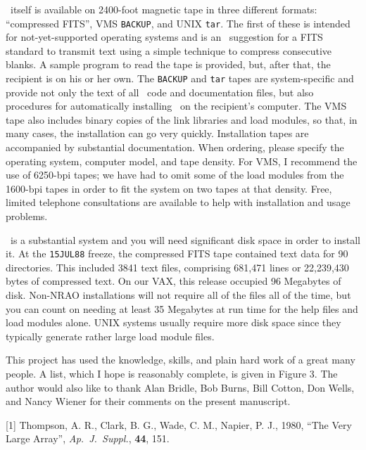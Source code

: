      \Aips\ itself is available on 2400-foot magnetic tape in three
different formats: ``compressed FITS'', VMS {\tt BACKUP}, and UNIX
{\tt tar}.  The first of these is intended for not-yet-supported
operating systems and is an \AIPS\ suggestion for a FITS standard
to transmit text using a simple technique to compress consecutive
blanks.  A sample program to read the tape is provided, but, after
that, the recipient is on his or her own.  The {\tt BACKUP} and {\tt tar}
tapes are system-specific and provide not only the text of all \AIPS\
code and documentation files, but also procedures for automatically
installing \AIPS\ on the recipient's computer.  The VMS tape also
includes binary copies of the link libraries and load modules, so
that, in many cases, the installation can go very quickly.
Installation tapes are accompanied by substantial documentation.
When ordering, please specify the operating system, computer model,
and tape density.  For VMS, I recommend the use of 6250-bpi tapes;
we have had to omit some of the load modules from the 1600-bpi tapes
in order to fit the system on two tapes at that density.  Free, limited
telephone consultations are available to help with installation and
usage problems.

     \Aips\ is a substantial system and you will need significant disk
space in order to install it.  At the {\tt 15JUL88} freeze, the
compressed FITS tape contained text data for 90 directories.  This
included 3841 text files, comprising 681,471 lines or 22,239,430 bytes
of compressed text.  On our VAX, this release occupied 96 Megabytes of
disk.  Non-NRAO installations will not require all of the files all
of the time, but you can count on needing at least 35 Megabytes at run
time for the help files and load modules alone.  UNIX systems usually
require more disk space since they typically generate rather large
load module files.


     This project has used the knowledge, skills, and plain hard work
of a great many people.  A list, which I hope is reasonably complete,
is given in Figure 3.  The author would also like to thank Alan Bridle,
Bob Burns, Bill Cotton, Don Wells, and Nancy Wiener for their comments
on the present manuscript.

\vfill\eject%

\pl
\item{[1]} Thompson, A. R., Clark, B. G., Wade, C. M., Napier, P. J.,
1980, ``The Very Large Array'', {\it Ap.~J.~Suppl.}, {\bf 44}, 151.

